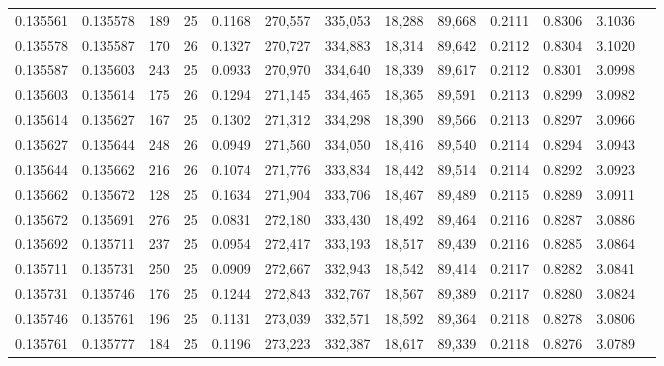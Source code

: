\begin{tabular}{rrrrrrrrrrrrr}
0.135561 & 0.135578 &   189 &  25 &                                     0.1168 & 270,557 & 335,053 &  18,288 &  89,668 & 0.2111 & 0.8306 & 3.1036 \\
0.135578 & 0.135587 &   170 &  26 &                                     0.1327 & 270,727 & 334,883 &  18,314 &  89,642 & 0.2112 & 0.8304 & 3.1020 \\
0.135587 & 0.135603 &   243 &  25 &                                     0.0933 & 270,970 & 334,640 &  18,339 &  89,617 & 0.2112 & 0.8301 & 3.0998 \\
0.135603 & 0.135614 &   175 &  26 &                                     0.1294 & 271,145 & 334,465 &  18,365 &  89,591 & 0.2113 & 0.8299 & 3.0982 \\
0.135614 & 0.135627 &   167 &  25 &                                     0.1302 & 271,312 & 334,298 &  18,390 &  89,566 & 0.2113 & 0.8297 & 3.0966 \\
0.135627 & 0.135644 &   248 &  26 &                                     0.0949 & 271,560 & 334,050 &  18,416 &  89,540 & 0.2114 & 0.8294 & 3.0943 \\
0.135644 & 0.135662 &   216 &  26 &                                     0.1074 & 271,776 & 333,834 &  18,442 &  89,514 & 0.2114 & 0.8292 & 3.0923 \\
0.135662 & 0.135672 &   128 &  25 &                                     0.1634 & 271,904 & 333,706 &  18,467 &  89,489 & 0.2115 & 0.8289 & 3.0911 \\
0.135672 & 0.135691 &   276 &  25 &                                     0.0831 & 272,180 & 333,430 &  18,492 &  89,464 & 0.2116 & 0.8287 & 3.0886 \\
0.135692 & 0.135711 &   237 &  25 &                                     0.0954 & 272,417 & 333,193 &  18,517 &  89,439 & 0.2116 & 0.8285 & 3.0864 \\
0.135711 & 0.135731 &   250 &  25 &                                     0.0909 & 272,667 & 332,943 &  18,542 &  89,414 & 0.2117 & 0.8282 & 3.0841 \\
0.135731 & 0.135746 &   176 &  25 &                                     0.1244 & 272,843 & 332,767 &  18,567 &  89,389 & 0.2117 & 0.8280 & 3.0824 \\
0.135746 & 0.135761 &   196 &  25 &                                     0.1131 & 273,039 & 332,571 &  18,592 &  89,364 & 0.2118 & 0.8278 & 3.0806 \\
0.135761 & 0.135777 &   184 &  25 &                                     0.1196 & 273,223 & 332,387 &  18,617 &  89,339 & 0.2118 & 0.8276 & 3.0789 \\

\end{tabular}
